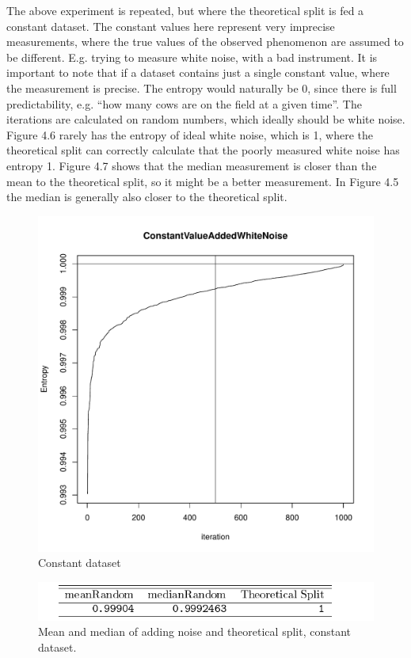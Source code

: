 The above experiment is repeated, but where the theoretical split is fed a constant dataset. The constant values here represent very imprecise measurements, where the true values of the observed phenomenon are assumed to be different. E.g. trying to measure white noise, with a bad instrument. It is important to note that if a dataset contains just a single constant value, where the measurement is precise. The entropy would naturally be 0, since there is full predictability, e.g. “how many cows are on the field at a given time”. The iterations are calculated on random numbers, which ideally should be white noise. Figure 4.6 rarely has the entropy of ideal white noise, which is 1, where the theoretical split can correctly calculate that the poorly measured white noise has entropy 1. Figure 4.7 shows that the median measurement is closer than the mean to the theoretical split, so it might be a better measurement. In Figure 4.5 the median is generally also closer to the theoretical split. 

\begin{figure}
    \centering
\includegraphics[width=\textwidth,keepaspectratio]{./Weather/constantWithWhiteNoiseStochasticTheoretical.pdf}
    \caption{Constant dataset}
\end{figure}

\begin{figure}
    \centering
    \includegraphics[width=\textwidth,keepaspectratio]{./Weather/random_vs_theoreticalSplitWhiteNoise.pdf}
    \caption{Mean and median of adding noise and theoretical split, constant dataset.}
\end{figure}

